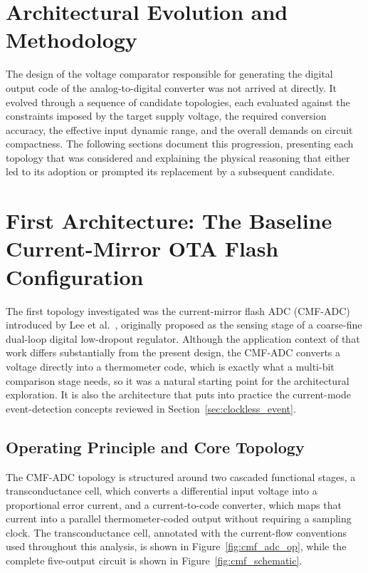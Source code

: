 \section{Architectural Evolution and Methodology}
The design of the voltage comparator responsible for generating the digital
output code of the analog-to-digital converter was not arrived at directly.
It evolved through a sequence of candidate topologies, each evaluated against
the constraints imposed by the target supply voltage, the required conversion
accuracy, the effective input dynamic range, and the overall demands on circuit
compactness. The following sections document this progression, presenting
each topology that was considered and explaining the physical reasoning that
either led to its adoption or prompted its replacement by a subsequent
candidate.


\section{First Architecture: The Baseline Current-Mirror OTA Flash Configuration}

The first topology investigated was the current-mirror flash ADC (CMF-ADC)
introduced by Lee et al.~\cite{lee2017}, originally proposed as the
sensing stage of a coarse-fine dual-loop digital low-dropout regulator.
Although the application context of that work differs substantially from the
present design, the CMF-ADC converts a voltage directly into a thermometer
code, which is exactly what a multi-bit comparison stage needs, so it was a
natural starting point for the architectural exploration. It is also the
architecture that puts into practice the current-mode event-detection
concepts reviewed in Section~\ref{sec:clockless_event}.


\subsection{Operating Principle and Core Topology}

The CMF-ADC topology is structured
around two cascaded functional stages, a transconductance cell, which converts a
differential input voltage into a proportional error current, and a
current-to-code converter, which maps that current into a parallel thermometer-coded
output without requiring a sampling clock. The transconductance cell, annotated with the
current-flow conventions used throughout this analysis, is shown in
Figure~\ref{fig:cmf_adc_op}, while the complete five-output circuit is shown in
Figure~\ref{fig:cmf_schematic}.

